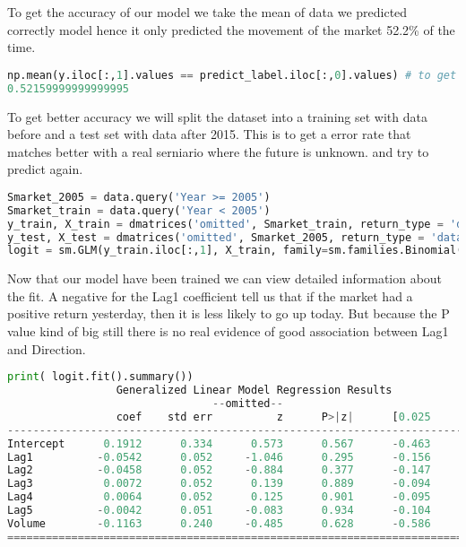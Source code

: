 To get the accuracy of our model we take the mean of data we predicted correctly model hence it only predicted the movement of the market 52.2\% of the time.
\begin{lstlisting}[language=Python]
np.mean(y.iloc[:,1].values == predict_label.iloc[:,0].values) # to get accuracy
0.52159999999999995
\end{lstlisting}
To get better accuracy we will split the dataset into a training set with data before and a test set with data after 2015. This is to get a error rate that matches better with a real serniario where the future is unknown. and try to predict again.

\begin{lstlisting}[language=Python]
Smarket_2005 = data.query('Year >= 2005')
Smarket_train = data.query('Year < 2005')
y_train, X_train = dmatrices('omitted', Smarket_train, return_type = 'dataframe')
y_test, X_test = dmatrices('omitted', Smarket_2005, return_type = 'dataframe')
logit = sm.GLM(y_train.iloc[:,1], X_train, family=sm.families.Binomial())
\end{lstlisting}

Now that our model have been trained we can view detailed information about the fit. A negative for the Lag1 coefficient tell us that if the market had a positive return yesterday, then it is less likely to go up today. But because the P value kind of big still there is no real evidence of good association between Lag1 and Direction.

\begin{lstlisting}[language=Python]
print( logit.fit().summary())
                 Generalized Linear Model Regression Results                  
								--omitted--
				 coef    std err          z      P>|z|      [0.025      0.975]
------------------------------------------------------------------------------
Intercept      0.1912      0.334      0.573      0.567      -0.463       0.845
Lag1          -0.0542      0.052     -1.046      0.295      -0.156       0.047
Lag2          -0.0458      0.052     -0.884      0.377      -0.147       0.056
Lag3           0.0072      0.052      0.139      0.889      -0.094       0.108
Lag4           0.0064      0.052      0.125      0.901      -0.095       0.108
Lag5          -0.0042      0.051     -0.083      0.934      -0.104       0.096
Volume        -0.1163      0.240     -0.485      0.628      -0.586       0.353
==============================================================================
\end{lstlisting}


